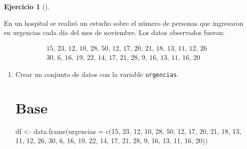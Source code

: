 \documentclass[
  spanish,
  a4paper,
]{scrreport}
\newenvironment{Shaded}{\begin{snugshade}}{\end{snugshade}}
\newcommand{\AttributeTok}[1]{\textcolor[rgb]{0.40,0.45,0.13}{#1}}
\newcommand{\DecValTok}[1]{\textcolor[rgb]{0.68,0.00,0.00}{#1}}
\newcommand{\FunctionTok}[1]{\textcolor[rgb]{0.28,0.35,0.67}{#1}}
\newcommand{\NormalTok}[1]{\textcolor[rgb]{0.00,0.23,0.31}{#1}}
\newcommand{\OtherTok}[1]{\textcolor[rgb]{0.00,0.23,0.31}{#1}}
\theoremstyle{definition}
\newtheorem{exercise}{Ejercicio}[chapter]
\theoremstyle{remark}
\begin{document}
\begin{exercise}[]\protect\hypertarget{exr-frecuencias-graficos-urgencias}{}\label{exr-frecuencias-graficos-urgencias}

En un hospital se realizó un estudio sobre el número de personas que
ingresaron en urgencias cada día del mes de noviembre. Los datos
observados fueron:

\[
\begin{array}{c}
\mbox{15, 23, 12, 10, 28, 50, 12, 17, 20, 21, 18, 13, 11, 12, 26} \\
\mbox{30, 6, 16, 19, 22, 14, 17, 21, 28, 9, 16, 13, 11, 16, 20}
\end{array}
\]

\begin{enumerate}
\def\labelenumi{\alph{enumi}.}
\item
  Crear un conjunto de datos con la variable \texttt{urgencias}.

  \begin{tcolorbox}[enhanced jigsaw, titlerule=0mm, arc=.35mm, rightrule=.15mm, opacitybacktitle=0.6, leftrule=.75mm, colframe=quarto-callout-tip-color-frame, toptitle=1mm, breakable, colbacktitle=quarto-callout-tip-color!10!white, bottomrule=.15mm, colback=white, left=2mm, bottomtitle=1mm, opacityback=0, title=\textcolor{quarto-callout-tip-color}{\faLightbulb}\hspace{0.5em}{Solución}, toprule=.15mm, coltitle=black]

  \section{Base}

\begin{Shaded}
\begin{Highlighting}[]
\NormalTok{df }\OtherTok{\textless{}{-}} \FunctionTok{data.frame}\NormalTok{(}\AttributeTok{urgencias =} \FunctionTok{c}\NormalTok{(}\DecValTok{15}\NormalTok{, }\DecValTok{23}\NormalTok{, }\DecValTok{12}\NormalTok{, }\DecValTok{10}\NormalTok{, }\DecValTok{28}\NormalTok{, }\DecValTok{50}\NormalTok{, }\DecValTok{12}\NormalTok{, }\DecValTok{17}\NormalTok{, }\DecValTok{20}\NormalTok{, }\DecValTok{21}\NormalTok{, }\DecValTok{18}\NormalTok{, }\DecValTok{13}\NormalTok{, }\DecValTok{11}\NormalTok{, }\DecValTok{12}\NormalTok{, }\DecValTok{26}\NormalTok{, }\DecValTok{30}\NormalTok{, }\DecValTok{6}\NormalTok{, }\DecValTok{16}\NormalTok{, }\DecValTok{19}\NormalTok{, }\DecValTok{22}\NormalTok{, }\DecValTok{14}\NormalTok{, }\DecValTok{17}\NormalTok{, }\DecValTok{21}\NormalTok{, }\DecValTok{28}\NormalTok{, }\DecValTok{9}\NormalTok{, }\DecValTok{16}\NormalTok{, }\DecValTok{13}\NormalTok{, }\DecValTok{11}\NormalTok{, }\DecValTok{16}\NormalTok{, }\DecValTok{20}\NormalTok{))}
\end{Highlighting}
\end{Shaded}


\end{tcolorbox}
\end{enumerate}
\end{exercise}
\end{document}
